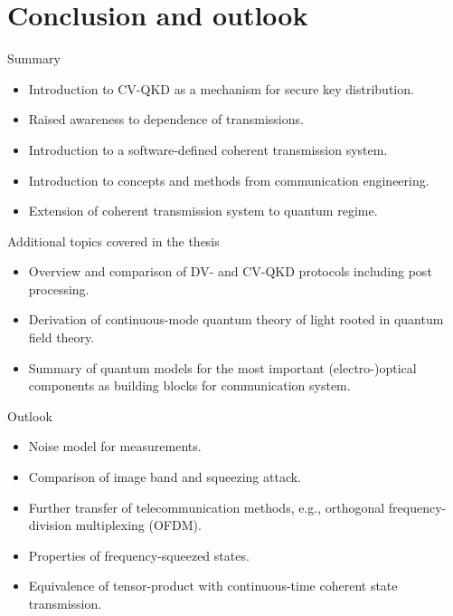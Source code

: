 \documentclass[aspectratio=169,usenames,dvipsnames]{beamer}
\begin{document}
	\section{Conclusion and outlook}
	
	\begin{frame}{Summary}
		\begin{itemize}
			\item Introduction to CV-QKD as a mechanism for secure key distribution.
			\item Raised awareness to dependence of transmissions.
			\item Introduction to a software-defined coherent transmission system.
			\item Introduction to concepts and methods from communication engineering.
			\item Extension of coherent transmission system to quantum regime.
		\end{itemize}
	\end{frame}
	
	\begin{frame}{Additional topics covered in the thesis}
		\begin{itemize}
			\item Overview and comparison of DV- and CV-QKD protocols including post processing.
			\item Derivation of continuous-mode quantum theory of light rooted in quantum field theory.
			\item Summary of quantum models for the most important (electro-)optical components as building blocks for communication system.
		\end{itemize}		
	\end{frame}
	
	\begin{frame}{Outlook}
		\begin{itemize}
			\item Noise model for measurements.
			\item Comparison of image band and squeezing attack.
			\item Further transfer of telecommunication methods, e.g., orthogonal frequency-division multiplexing (OFDM).
			\item Properties of frequency-squeezed states.
			\item Equivalence of tensor-product with continuous-time coherent state transmission.
		\end{itemize}
	\end{frame}
	
\end{document}
